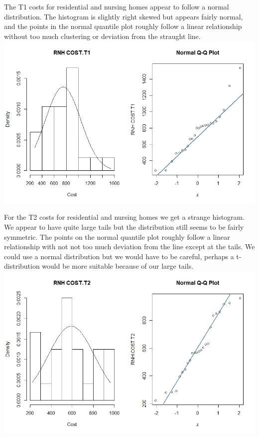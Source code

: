 \documentclass[]{article}
\begin{document}
The T1 costs for residential and nursing homes appear to follow a normal distribution. The histogram is slightly right skewed but appears fairly normal, and the points in the normal quantile plot roughly follow a linear relationship without too much clustering or deviation from the straught line.
\centering
\includegraphics[width=\textwidth]{RStudio/jpeg/Norm_RNH_T1.jpeg}
\raggedright

For the T2 costs for residential and nursing homes we get a strange histogram. We appear to have quite large tails but the distribution still seems to be fairly symmetric. The points on the normal quantile plot roughly follow a linear relationship with not not too much deviation from the line except at the tails. We could use a normal distribution but we would have to be careful, perhaps a t-distribution would be more suitable because of our large tails.
\centering
\includegraphics[width=\textwidth]{RStudio/jpeg/Norm_RNH_T2.jpeg}
\raggedright
\end{document}
